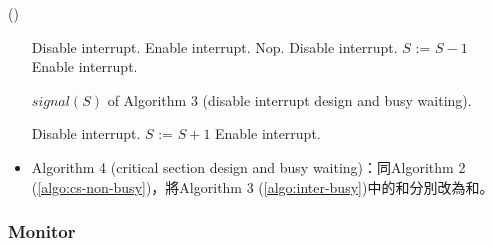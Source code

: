 \begin{theorem}{()}
\begin{itemize}
\begin{algorithm}[H]
            \begin{algorithmic}[1]
                    \State Disable interrupt.
                        \State Enable interrupt.
                        \State Nop.
                        \State Disable interrupt.
                    \EndWhile
                    \State $S$ := $S - 1$ 
                    \State Enable interrupt.
                \EndFunction
            \end{algorithmic}
        \end{algorithm}
        \begin{algorithm}[H]
            \caption{$signal(S)$ of Algorithm 3 (disable interrupt design and busy waiting).}
            \begin{algorithmic}[1]
                    \State Disable interrupt.
                    \State $S$ := $S + 1$
                    \State Enable interrupt.
                \EndFunction
            \end{algorithmic}
        \end{algorithm}
        \item Algorithm 4 (critical section design and busy waiting)：同Algorithm 2 (\ref{algo:cs-non-busy})，將Algorithm 3 (\ref{algo:inter-busy})中的和分別改為和。
    \end{itemize}
\end{theorem}

\subsubsection{Monitor}


